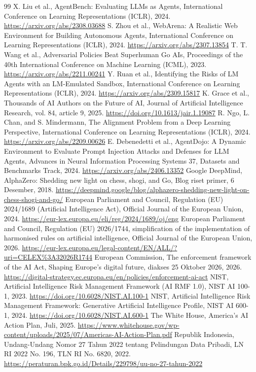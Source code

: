 \documentclass[conference,a4paper]{IEEEtran}
\begin{document}
\begin{thebibliography}{99}
 X. Liu et al., AgentBench: Evaluating LLMs as Agents, International Conference on Learning Representations (ICLR), 2024. \url{https://arxiv.org/abs/2308.03688}
 S. Zhou et al., WebArena: A Realistic Web Environment for Building Autonomous Agents, International Conference on Learning Representations (ICLR), 2024. \url{https://arxiv.org/abs/2307.13854}
 T. T. Wang et al., Adversarial Policies Beat Superhuman Go AIs, Proceedings of the 40th International Conference on Machine Learning (ICML), 2023. \url{https://arxiv.org/abs/2211.00241}
 Y. Ruan et al., Identifying the Risks of LM Agents with an LM-Emulated Sandbox, International Conference on Learning Representations (ICLR), 2024. \url{https://arxiv.org/abs/2309.15817}
 K. Grace et al., Thousands of AI Authors on the Future of AI, Journal of Artificial Intelligence Research, vol. 84, article 9, 2025. \url{https://doi.org/10.1613/jair.1.19087}
 R. Ngo, L. Chan, and S. Mindermann, The Alignment Problem from a Deep Learning Perspective, International Conference on Learning Representations (ICLR), 2024. \url{https://arxiv.org/abs/2209.00626}
 E. Debenedetti et al., AgentDojo: A Dynamic Environment to Evaluate Prompt Injection Attacks and Defenses for LLM Agents, Advances in Neural Information Processing Systems 37, Datasets and Benchmarks Track, 2024. \url{https://arxiv.org/abs/2406.13352}
 Google DeepMind, AlphaZero: Shedding new light on chess, shogi, and Go, Blog riset primer, 6 Desember, 2018. \url{https://deepmind.google/blog/alphazero-shedding-new-light-on-chess-shogi-and-go/}
 European Parliament and Council, Regulation (EU) 2024/1689 (Artificial Intelligence Act), Official Journal of the European Union, 2024. \url{https://eur-lex.europa.eu/eli/reg/2024/1689/oj/eng}
 European Parliament and Council, Regulation (EU) 2026/1744, simplification of the implementation of harmonised rules on artificial intelligence, Official Journal of the European Union, 2026. \url{https://eur-lex.europa.eu/legal-content/EN/ALL/?uri=CELEX%3A32026R1744}
 European Commission, The enforcement framework of the AI Act, Shaping Europe's digital future, diakses 25 Oktober 2026, 2026. \url{https://digital-strategy.ec.europa.eu/en/policies/enforcement-ai-act}
 NIST, Artificial Intelligence Risk Management Framework (AI RMF 1.0), NIST AI 100-1, 2023. \url{https://doi.org/10.6028/NIST.AI.100-1}
 NIST, Artificial Intelligence Risk Management Framework: Generative Artificial Intelligence Profile, NIST AI 600-1, 2024. \url{https://doi.org/10.6028/NIST.AI.600-1}
 The White House, America's AI Action Plan, Juli, 2025. \url{https://www.whitehouse.gov/wp-content/uploads/2025/07/Americas-AI-Action-Plan.pdf}
 Republik Indonesia, Undang-Undang Nomor 27 Tahun 2022 tentang Pelindungan Data Pribadi, LN RI 2022 No. 196, TLN RI No. 6820, 2022. \url{https://peraturan.bpk.go.id/Details/229798/uu-no-27-tahun-2022}
\end{thebibliography}
\end{document}
